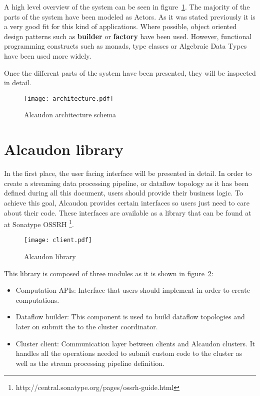 A high level overview of the system can be seen in
figure~\ref{fig:architecture}. The majority of the parts of the system have been
modeled as Actors. As it was stated previously it is a very good fit for this
kind of applications. Where possible, object oriented design patterns\cite{gof}
such as \textbf{builder} or \textbf{factory} have been used. However, functional
programming constructs such as monads\cite{monads}, type
classes\cite{typeclasses} or Algebraic Data Types have been used more widely.

Once the different parts of the system have been presented, they will be
inspected in detail.

\begin{figure}
  \centering
  \texttt{[image: architecture.pdf]}
  \caption{Alcaudon architecture schema}
  \label{fig:architecture}
\end{figure}

\section{Alcaudon library}

In the first place, the user facing interface will be presented in detail. In order
to create a streaming data processing pipeline, or dataflow topology as it has
been defined during all this document, users should provide their business
logic. To achieve this goal, Alcaudon provides certain interfaces so users
just need to care about their code. These interfaces are available as a library
that can be found at at Sonatype OSSRH \footnote{http://central.sonatype.org/pages/ossrh-guide.html}.

\begin{figure}
  \centering
  \texttt{[image: client.pdf]}
  \caption{Alcaudon library}
  \label{fig:library}
\end{figure}

This library is composed of three modules as it is shown in figure~\ref{fig:library}:

\begin{itemize}
\item Computation \acs{API}s: Interface that users should implement in order to
  create computations.
\item Dataflow builder: This component is used to build dataflow topologies and
  later on submit the to the cluster coordinator.
\item Cluster client: Communication layer between clients and Alcaudon clusters.
  It handles all the operations needed to submit custom code to the cluster as well
  as the stream processing pipeline definition.
\end{itemize}

